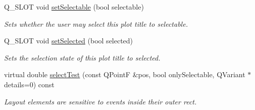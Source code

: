 \begin{DoxyCompactItemize}
Q\+\_\+\+S\+L\+O\+T void \hyperlink{classQCPPlotTitle_a8866b07b9fa14877d4cefbf38406c5dd}{set\+Selectable} (bool selectable)
\begin{DoxyCompactList}\small\item\em Sets whether the user may select this plot title to {\itshape selectable}. \end{DoxyCompactList}\item 
Q\+\_\+\+S\+L\+O\+T void \hyperlink{classQCPPlotTitle_a8d441a889d371307df86f1ab7687a333}{set\+Selected} (bool selected)
\begin{DoxyCompactList}\small\item\em Sets the selection state of this plot title to {\itshape selected}. \end{DoxyCompactList}\item 
virtual double \hyperlink{classQCPPlotTitle_a5b7ae716be9134a48f4e378feb0e6699}{select\+Test} (const Q\+Point\+F \&pos, bool only\+Selectable, Q\+Variant $\ast$details=0) const 
\begin{DoxyCompactList}\small\item\em Layout elements are sensitive to events inside their outer rect. \end{DoxyCompactList}\end{DoxyCompactItemize}
